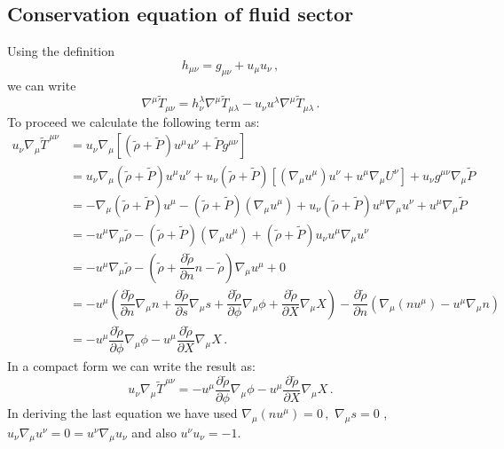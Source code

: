 \documentclass[a4paper,12pt]{article}
\newcommand{\ti}[1]{\ensuremath{ \tilde{#1}}}
\newcommand{\nb}{\ensuremath{ \nabla }}
\newcommand{\m}{\ensuremath{{\mu \nu}}}
\newcommand{\p}{\ensuremath{\partial{}}}
\begin{document}
\subsection{Conservation equation of fluid sector}

Using the definition
\begin{equation}\label{}
h_{\m} = g_{\m} + u_{\mu}u_{\nu }\,,
\end{equation}
we can write
\begin{equation}\label{Energy Momentum Tensor1}
\nb^{\mu}	\ti{T}_{\m} = h_{\nu}^{\lambda}\nb^{\mu} \ti{T}_{\mu \lambda} - u_\nu u^\lambda \nb^{\mu}\ti{T}_{\mu \lambda}\,. 
\end{equation}
To proceed we calculate the following term as:
\begin{equation}
\begin{split}
u_\nu \nb_{\mu}\ti{T}^{\,\m}  &= u_\nu \nb_{\mu} \left[ (\tilde{\rho} + \tilde{P})u^\mu u^\nu + \tilde{P}g^{\m}\right]\\
& = u_\nu \nb_{\mu}(\ti{\rho}+ \ti{P})u^{\mu}u^{\nu} + u_\nu (\ti{\rho}+ \ti{P}) \left[ (\nb_{\mu}u^{\mu}) u^{\nu}  +u^{\mu} \nb_{\mu}U^{\nu} \right]  + u_{\nu}g^{\m} \nb_{\mu}\ti{P} \\ 
& =- \nb_{\mu}(\ti{\rho}+ \ti{P})u^{\mu} - (\ti{\rho}+ \ti{P})(\nb_{\mu}u^{\mu}) + u_{\nu}(\ti{\rho}+ \ti{P})u^{\mu}\nb_{\mu}u^{\nu} + u^{\mu}\nb_{\mu}\ti{P} \\ 
& =- u^{\mu}\nb_{\mu}\ti{\rho} - (\ti{\rho}+ \ti{P})(\nb_{\mu}u^{\mu}) + (\ti{\rho}+ \ti{P})u_{\nu}u^{\mu}\nb_{\mu}u^{\nu}\\
& = -u^{\mu}\nb_{\mu}\ti{\rho} - \left( \ti{\rho} + \dfrac{\p \ti{\rho}}{\p n} n -\ti{\rho}\right)\nb_{\mu}u^{\mu}  + 0 \\
& = -u^{\mu}\left(\dfrac{\p \ti{\rho}}{\p n}\nb_{\mu}n + \dfrac{\p \ti{\rho}}{\p s}\nb_{\mu}s + \dfrac{\p \ti{\rho}}{\p \phi}\nb_{\mu}\phi + \dfrac{\p \ti{\rho}}{\p X}\nb_{\mu}X \right) - \dfrac{\p \ti{\rho}}{\p n}\left( \nb_{\mu}(nu^{\mu}) - u^{\mu}\nb_{\mu}n \right) \\
& = -u^{\mu}\dfrac{\p \ti{\rho}}{\p \phi}\nb_{\mu} \phi - u^{\mu}\dfrac{\p \ti{\rho}}{\p X}\nb_{\mu} X\,.
\nonumber
\end{split}
\end{equation}
In a compact form we can write the result as:
\begin{equation}\label{perpendicular component1}
u_\nu \nb_{\mu}\ti{T}^{\,\m} = -u^{\mu}\dfrac{\p \ti{\rho}}{\p \phi}\nb_{\mu} \phi - u^{\mu}\dfrac{\p \ti{\rho}}{\p X}\nb_{\mu} X\,.
\end{equation}
In deriving the last equation we have used $\nb_{\mu}(nu^{\mu}) = 0\,,\,\,\nb_{\mu}s = 0$ , $u_{\nu}\nb_{\mu}u^{\nu} = 0  = u^{\nu}\nb_{\mu}u_{\nu}$ and also $u^{\nu}u_{\nu} =-1$. 
\end{document}
